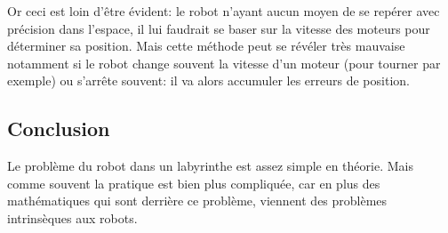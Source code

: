     Or ceci est loin d'être évident: le robot n'ayant aucun moyen de se repérer
    avec précision dans l'espace, il lui faudrait se baser sur la vitesse des
    moteurs pour déterminer sa position. Mais cette méthode peut se révéler
    très mauvaise notamment si le robot change souvent la vitesse d'un moteur
    (pour tourner par exemple) ou s'arrête souvent: il va alors accumuler les
    erreurs de position.

  \subsection{Conclusion}
    Le problème du robot dans un labyrinthe est assez simple en théorie. Mais
    comme souvent la pratique est bien plus compliquée, car en plus des
    mathématiques qui sont derrière ce problème, viennent des problèmes
    intrinsèques aux robots.


